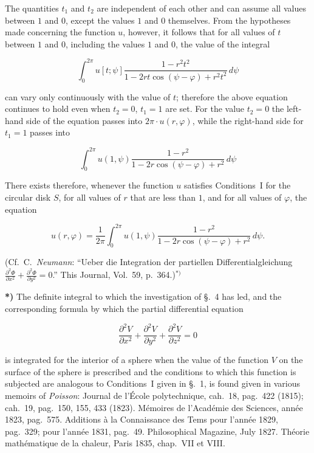 \documentclass{article}
\begin{document}
The quantities $t_1$ and $t_2$ are independent of each other and can assume all values between $1$ and $0$, except the values $1$ and $0$ themselves. From the hypotheses made concerning the function $u$, however, it follows that for all values of $t$ between $1$ and $0$, including the values $1$ and $0$, the value of the integral

\[

\int_0^{2\pi} u[t; \psi] \frac{1 - r^2 t^2}{1 - 2rt \cos(\psi - \varphi) + r^2 t^2}\,d\psi

\]

can vary only continuously with the value of $t$; therefore the above equation continues to hold even when $t_2 = 0$, $t_1 = 1$ are set. For the value $t_2 = 0$ the left-hand side of the equation passes into $2\pi \cdot u(r, \varphi)$, while the right-hand side for $t_1 = 1$ passes into

\[

\int_0^{2\pi} u(1, \psi) \frac{1 - r^2}{1 - 2r \cos(\psi - \varphi) + r^2}\,d\psi

\]



There exists therefore, whenever the function $u$ satisfies Conditions~I for the circular disk $S$, for all values of $r$ that are less than $1$, and for all values of $\varphi$, the equation

\[

u(r, \varphi) = \frac{1}{2\pi} \int_0^{2\pi} u(1, \psi) \frac{1 - r^2}{1 - 2r \cos(\psi - \varphi) + r^2}\,d\psi.

\]



(Cf.~C.~\emph{Neumann}: ``Ueber die Integration der partiellen Differentialgleichung $\frac{\partial^2 \varPhi}{\partial x^2} + \frac{\partial^2 \varPhi}{\partial y^2} = 0$.'' This Journal, Vol.~59, p.~364.)${}^{*)}$







\textbf{*)} The definite integral to which the investigation of §.~4 has led, and the corresponding formula by which the partial differential equation

\[

\frac{\partial^2 V}{\partial x^2} + \frac{\partial^2 V}{\partial y^2} + \frac{\partial^2 V}{\partial z^2} = 0

\]

is integrated for the interior of a sphere when the value of the function $V$ on the surface of the sphere is prescribed and the conditions to which this function is subjected are analogous to Conditions~I given in §.~1, is found given in various memoirs of \emph{Poisson}: Journal de l'École polytechnique, cah.~18, pag.~422 (1815); cah.~19, pag.~150, 155, 433 (1823). Mémoires de l'Académie des Sciences, année 1823, pag.~575. Additions à la Connaissance des Tems pour l'année 1829, pag.~329; pour l'année 1831, pag.~49. Philosophical Magazine, July 1827. Théorie mathématique de la chaleur, Paris 1835, chap.~VII et VIII.
\end{document}
